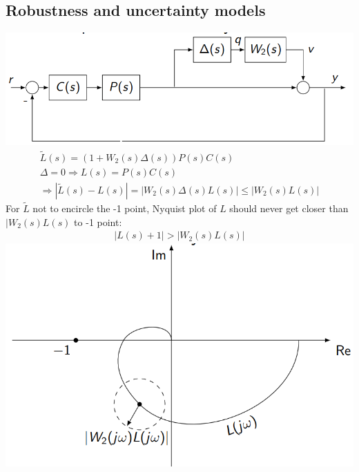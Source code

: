 \subsection{Robustness and uncertainty models}
    \includegraphics[width = \linewidth]{src/images/uncertainty_block_diagram.png}
    \begin{align*}
        \tilde L(s) = (1 + W_2(s) \Delta(s)) P(s) C(s)\\
        \Delta = 0 \Rightarrow L(s) = P(s) C(s)\\
        \Rightarrow |\tilde L(s) - L(s)| = |W_2(s) \Delta(s) L(s)| \leq |W_2(s) L(s)|
    \end{align*}
    For $\tilde L$ not to encircle the -1 point, Nyquist plot of $L$ should never get closer than $|W_2(s) L(s)$ to -1 point:
    \begin{align*}
        |L(s) + 1| > |W_2(s) L(s)|
    \end{align*}
    \includegraphics[width = \linewidth]{src/images/uncertainty_nyquist.png}